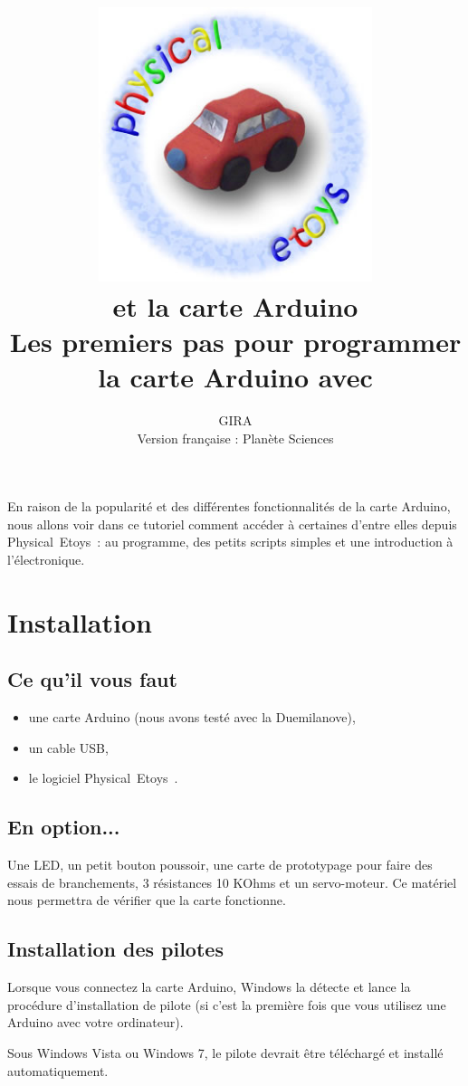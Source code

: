 \documentclass[french]{etoys-guide}
\title{
	\includegraphics[width=8cm]{../../shared/images/physical_etoys_logo.jpg}\\
	\vfill
	\vspace{3em}
	\LARGE{\textbf{\appName et la carte Arduino}}\\[1cm]
	\large{Les premiers pas pour programmer la carte Arduino avec \appName}\\[1cm]
	\vfill
}
\author{
GIRA \\
Version française : Planète Sciences
}
\def\appName{Physical~Etoys~}
\begin{document}
\insertcover
\maketitle
\cleardoublepage
\tableofcontents
\cleardoublepage

En raison de la popularité et des différentes fonctionnalités de la carte
Arduino, nous allons voir dans ce tutoriel comment accéder à certaines d'entre
elles depuis \appName : au programme, des petits scripts simples et une
introduction à l'électronique.

\section{Installation}

\subsection{Ce qu'il vous faut}

\begin{itemize}
        \item une carte Arduino (nous avons testé avec la Duemilanove),
        \item un cable USB,
        \item le logiciel \appName.
\end{itemize}


\subsection{En option...}

Une LED, un petit bouton poussoir, une carte de prototypage pour faire des
essais de branchements, 3 résistances 10 KOhms et un servo-moteur. Ce matériel
nous permettra de vérifier que la carte fonctionne. 

\subsection{Installation des pilotes}

Lorsque vous connectez la carte Arduino, Windows la détecte et lance la
procédure d'installation de pilote (si c'est la première fois que vous utilisez
une Arduino avec votre ordinateur).

Sous Windows Vista ou Windows 7, le pilote devrait être téléchargé et installé
automatiquement.
\end{document}
